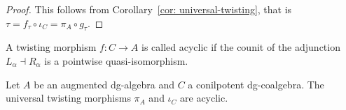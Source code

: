 \documentclass[../thesis.tex]{subfiles}
\begin{document}
            \begin{proof}
                This follows from Corollary~\ref{cor: universal-twisting}, that is $\tau = f_\tau \circ \iota_C = \pi_A\circ g_\tau$.
            \end{proof}

            \begin{definition}
                A twisting morphism $f: C \rightarrow A$ is called acyclic if the counit of the adjunction $L_\alpha \dashv R_\alpha$ is a pointwise quasi-isomorphism.
            \end{definition}

            \begin{lemma}\label{lem: uni-twist-ac}
                Let $A$ be an augmented dg-algebra and $C$ a conilpotent dg-coalgebra. The universal twisting morphisms $\pi_A$ and $\iota_C$ are acyclic.
            \end{lemma}
\end{document}
